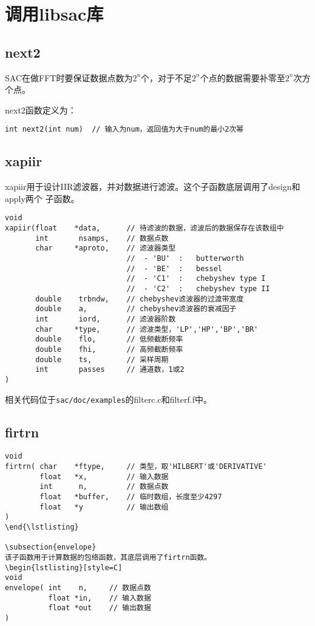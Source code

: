 \section{调用libsac库}
\subsection{next2}
SAC在做FFT时要保证数据点数为$2^n$个，对于不足$2^n$个点的数据需要补零至$2^n$次方个点。

next2函数定义为：
\begin{lstlisting}[style=C]
int next2(int num)  // 输入为num，返回值为大于num的最小2次幂
\end{lstlisting}

\subsection{xapiir}
xapiir用于设计IIR滤波器，并对数据进行滤波。这个子函数底层调用了design和apply两个
子函数。
\begin{lstlisting}[style=C]
void 
xapiir(float    *data,      // 待滤波的数据，滤波后的数据保存在该数组中
       int       nsamps,    // 数据点数 
       char     *aproto,    // 滤波器类型
                            //  - 'BU'  :   butterworth
                            //  - 'BE'  :   bessel
                            //  - 'C1'  :   chebyshev type I
                            //  - 'C2'  :   chebyshev type II
       double    trbndw,    // chebyshev滤波器的过渡带宽度
       double    a,         // chebyshev滤波器的衰减因子
       int       iord,      // 滤波器阶数
       char     *type,      // 滤波类型，'LP','HP','BP','BR'
       double    flo,       // 低频截断频率
       double    fhi,       // 高频截断频率
       double    ts,        // 采样周期
       int       passes     // 通道数，1或2
)
\end{lstlisting}

相关代码位于\lstinline{sac/doc/examples}的filterc.c和filterf.f中。

\subsection{firtrn}
\begin{lstlisting}[style=C]
void                                                                                
firtrn( char    *ftype,     // 类型，取'HILBERT'或'DERIVATIVE'
        float   *x,         // 输入数据                      
        int      n,         // 数据点数                                             
        float   *buffer,    // 临时数组，长度至少4297
        float   *y          // 输出数组
)
\end{\lstlisting}

\subsection{envelope}
该子函数用于计算数据的包络函数，其底层调用了firtrn函数。
\begin{lstlisting}[style=C]
void                                                                                
envelope( int    n,     // 数据点数
          float *in,    // 输入数据
          float *out    // 输出数据
)
\end{lstlisting}

